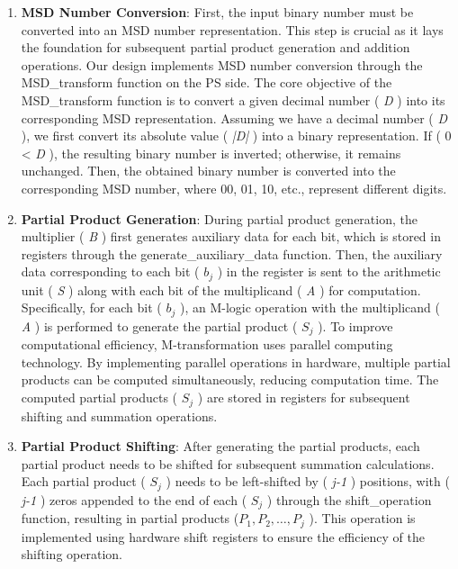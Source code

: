 \documentclass[electronics,article,accept,pdftex,moreauthors]{Definitions/mdpi}
\begin{document}
\begin{enumerate}[label={\arabic*).}]
\item  \textbf{MSD Number Conversion}: First, the input binary number must be converted into an MSD number representation. This step is crucial as it lays the foundation for subsequent partial product generation and addition operations. Our design implements MSD number conversion through the MSD\_transform function on the PS side. The core objective of the MSD\_transform function is to convert a given decimal number ( \textit{D} ) into its corresponding MSD representation. Assuming we have a decimal number ( \textit{D} ), we first convert its absolute value ( \textit{|D|} ) into a binary representation. If ( 0 < \textit{D} ), the resulting binary number is inverted; otherwise, it remains unchanged. Then, the obtained binary number is converted into the corresponding MSD number, where 00, 01, 10, etc., represent different digits.
\item \textbf{Partial Product Generation}: During partial product generation, the multiplier ( \textit{B} ) first generates auxiliary data for each bit, which is stored in registers through the generate\_auxiliary\_data function. Then, the auxiliary data corresponding to each bit ( $b_j$ ) in the register is sent to the arithmetic unit ( \textit{S} ) along with each bit of the multiplicand ( \textit{A }) for computation. Specifically, for each bit ( $b_j$ ), an M-logic operation with the multiplicand ( \textit{A} ) is performed to generate the partial product ( $S_j$ ). To improve computational efficiency, M-transformation uses parallel computing technology. By implementing parallel operations in hardware, multiple partial products can be computed simultaneously, reducing computation time. The computed partial products ( $S_j$ ) are stored in registers for subsequent shifting and summation operations.
\item  \textbf{Partial Product Shifting}: After generating the partial products, each partial product needs to be shifted for subsequent summation calculations. Each partial product ( $S_j$ ) needs to be left-shifted by ( \textit{j-1} ) positions, with ( \textit{j-1} ) zeros appended to the end of each ( $S_j$ ) through the shift\_operation function, resulting in partial products ($P_1, P_2, \ldots, P_j$ ). This operation is implemented using hardware shift registers to ensure the efficiency of the shifting operation.

\end{enumerate}
\end{document}

